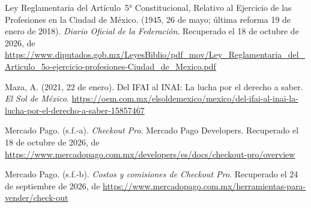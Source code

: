 \documentclass[12pt, a4paper]{article}
\begin{document}
\begin{list}{}{\setlength{\leftmargin}{1.27cm}\setlength{\itemindent}{-1.27cm}%
  \setlength{\labelwidth}{0pt}\setlength{\labelsep}{0pt}\setlength{\itemsep}{6pt}}
  
\item Ley Reglamentaria del Artículo~5° Constitucional, Relativo
  al Ejercicio de las Profesiones en la Ciudad de México.
  (1945, 26 de mayo; última reforma 19 de enero de 2018).
  \textit{Diario Oficial de la Federación}. Recuperado el 18 de octubre de 2026, de \url{https://www.diputados.gob.mx/LeyesBiblio/pdf_mov/Ley_Reglamentaria_del_Articulo_5o-ejercicio-profesiones-Ciudad_de_Mexico.pdf}


\item Maza, A. (2021, 22 de enero). Del IFAI al INAI:
  La lucha por el derecho a saber. \textit{El Sol de México}.
  \url{https://oem.com.mx/elsoldemexico/mexico/del-ifai-al-inai-la-lucha-por-el-derecho-a-saber-15857467}

  
\item Mercado Pago. (s.f.-a). \textit{Checkout Pro}. Mercado Pago Developers.
Recuperado el 18 de octubre de 2026, de \url{https://www.mercadopago.com.mx/developers/es/docs/checkout-pro/overview}

  
 \item Mercado Pago. (s.f.-b). \textit{Costos y comisiones de Checkout
  Pro}. Recuperado el 24 de septiembre de 2026, de
\url{https://www.mercadopago.com.mx/herramientas-para-vender/check-out}
 
 

\end{list}
\end{document}
